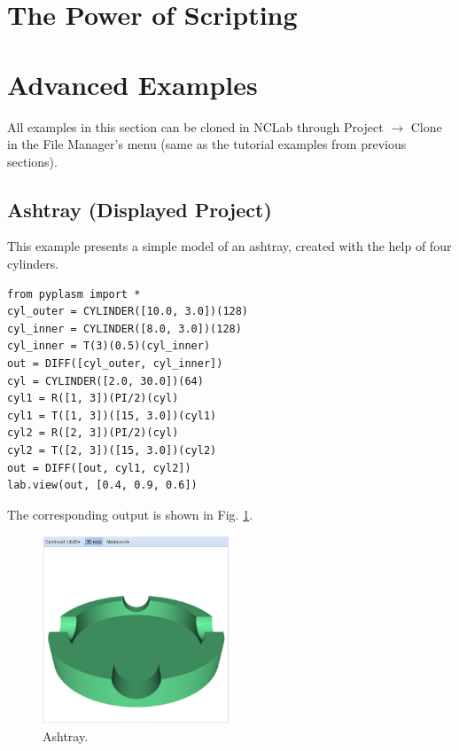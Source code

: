 \documentclass[article,A4,12pt]{llncs}
\begin{document}
\section{The Power of Scripting}







\section{Advanced Examples}

All examples in this section can be cloned in NCLab through 
Project $\rightarrow$ Clone in the File Manager's menu (same
as the tutorial examples from previous sections).
 
\subsection{Ashtray (Displayed Project)}

This example presents a simple model of an ashtray,
created with the help of four cylinders.
{\small
\begin{verbatim}
from pyplasm import *
cyl_outer = CYLINDER([10.0, 3.0])(128)
cyl_inner = CYLINDER([8.0, 3.0])(128)
cyl_inner = T(3)(0.5)(cyl_inner)
out = DIFF([cyl_outer, cyl_inner])
cyl = CYLINDER([2.0, 30.0])(64)
cyl1 = R([1, 3])(PI/2)(cyl)
cyl1 = T([1, 3])([15, 3.0])(cyl1)
cyl2 = R([2, 3])(PI/2)(cyl)
cyl2 = T([2, 3])([15, 3.0])(cyl2)
out = DIFF([out, cyl1, cyl2])
lab.view(out, [0.4, 0.9, 0.6])
\end{verbatim}
}
\noindent
The corresponding output is shown in Fig. \ref{fig:ashtray}.

\newpage

\begin{figure}[!ht]
\begin{center}
\includegraphics[width=0.5\textwidth]{img/ashtray.png}
\end{center}
\vspace{-2mm}
\caption{Ashtray.}
\label{fig:ashtray}
\end{figure}
\noindent
\end{document}
